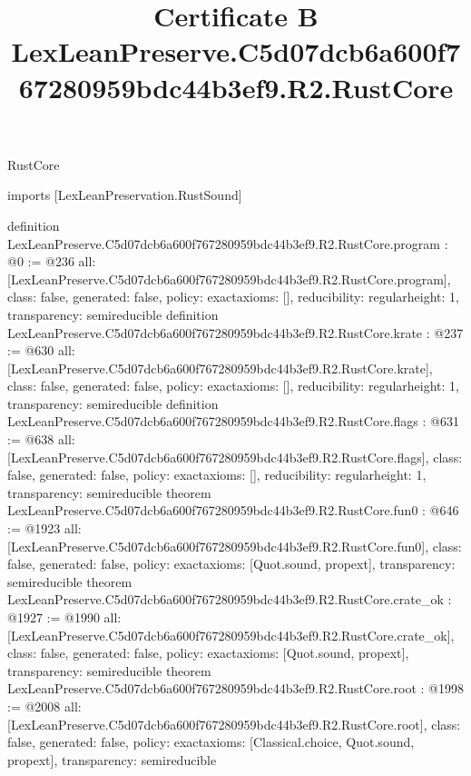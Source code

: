 \begin{lexlean}{RustCore}
\title{Certificate B LexLeanPreserve.C5d07dcb6a600f767280959bdc44b3ef9.R2.RustCore}
\begin{coremodule}
imports [LexLeanPreservation.RustSound]

definition LexLeanPreserve.C5d07dcb6a600f767280959bdc44b3ef9.R2.RustCore.program : @0 := @236 {
  all: [LexLeanPreserve.C5d07dcb6a600f767280959bdc44b3ef9.R2.RustCore.program],
  class: false,
  generated: false,
  policy: exact{axioms: []},
  reducibility: regular{height: 1},
  transparency: semireducible
}
definition LexLeanPreserve.C5d07dcb6a600f767280959bdc44b3ef9.R2.RustCore.krate : @237 := @630 {
  all: [LexLeanPreserve.C5d07dcb6a600f767280959bdc44b3ef9.R2.RustCore.krate],
  class: false,
  generated: false,
  policy: exact{axioms: []},
  reducibility: regular{height: 1},
  transparency: semireducible
}
definition LexLeanPreserve.C5d07dcb6a600f767280959bdc44b3ef9.R2.RustCore.flags : @631 := @638 {
  all: [LexLeanPreserve.C5d07dcb6a600f767280959bdc44b3ef9.R2.RustCore.flags],
  class: false,
  generated: false,
  policy: exact{axioms: []},
  reducibility: regular{height: 1},
  transparency: semireducible
}
theorem LexLeanPreserve.C5d07dcb6a600f767280959bdc44b3ef9.R2.RustCore.fun0 : @646 := @1923 {
  all: [LexLeanPreserve.C5d07dcb6a600f767280959bdc44b3ef9.R2.RustCore.fun0],
  class: false,
  generated: false,
  policy: exact{axioms: [Quot.sound, propext]},
  transparency: semireducible
}
theorem LexLeanPreserve.C5d07dcb6a600f767280959bdc44b3ef9.R2.RustCore.crate_ok : @1927 := @1990 {
  all: [LexLeanPreserve.C5d07dcb6a600f767280959bdc44b3ef9.R2.RustCore.crate_ok],
  class: false,
  generated: false,
  policy: exact{axioms: [Quot.sound, propext]},
  transparency: semireducible
}
theorem LexLeanPreserve.C5d07dcb6a600f767280959bdc44b3ef9.R2.RustCore.root : @1998 := @2008 {
  all: [LexLeanPreserve.C5d07dcb6a600f767280959bdc44b3ef9.R2.RustCore.root],
  class: false,
  generated: false,
  policy: exact{axioms: [Classical.choice, Quot.sound, propext]},
  transparency: semireducible
}


\end{coremodule}
\end{lexlean}
